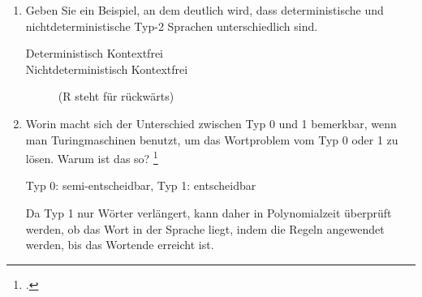 \documentclass{lehramt-informatik-aufgabe}
\begin{document}
\begin{enumerate}

\item Geben Sie ein Beispiel, an dem deutlich wird, dass
deterministische und nichtdeterministische Typ-2 Sprachen
unterschiedlich sind.

\begin{liAntwort}
\begin{description}
\item[Deterministisch Kontextfrei]

\item[Nichtdeterministisch Kontextfrei]
 (R steht für rückwärts)
\end{description}
\end{liAntwort}


\item Worin macht sich der Unterschied zwischen Typ 0 und 1 bemerkbar,
wenn man Turingmaschinen benutzt, um das Wortproblem vom Typ 0 oder 1 zu
lösen. Warum ist das so?
\footcite[Aufgabe 5b)]{theo:ab:5}

\begin{liAntwort}
Typ 0: semi-entscheidbar, Typ 1: entscheidbar

Da Typ 1 nur Wörter verlängert, kann daher in Polynomialzeit überprüft
werden, ob das Wort in der Sprache liegt, indem die Regeln angewendet
werden, bis das Wortende erreicht ist.
\end{liAntwort}

\end{enumerate}
\end{document}
